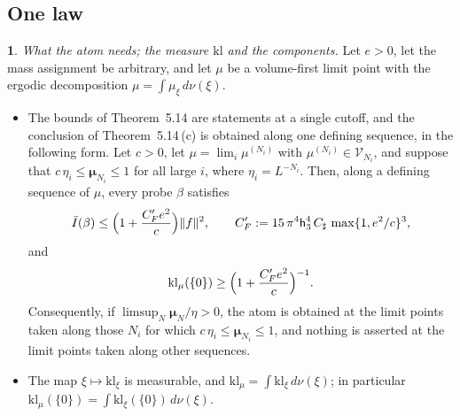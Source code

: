 \documentclass[11pt]{amsart}
\newcommand{\namedhead}{}
\theoremstyle{definition}
\newtheorem*{namedinner}{\namedhead}
\newenvironment{named}[1]{\renewcommand{\namedhead}{#1}\begin{namedinner}}{\end{namedinner}}
\begin{document}
\subsection{One law}

\begin{named}{Lemma 6.4}
\emph{What the atom needs; the measure $\mathrm{kl}$ and the components.}
Let $e>0$, let the mass assignment be arbitrary, and let $\mu$ be a volume-first limit point with the ergodic decomposition $\mu=\int\mu_\xi\,d\nu(\xi)$.
\begin{itemize}
\item[(a)] The bounds of Theorem~5.14 are statements at a single cutoff, and the conclusion of Theorem~5.14\,(c) is obtained along one defining sequence, in the following form.
Let $c>0$, let $\mu=\lim_i\mu^{(N_i)}$ with $\mu^{(N_i)}\in\mathcal V_{N_i}$, and suppose that $c\,\eta_i\le\boldsymbol\mu_{N_i}\le1$ for all large $i$, where $\eta_i=L^{-N_i}$.
Then, along a defining sequence of $\mu$, every probe $\beta$ satisfies
\begin{equation*}
\bar I(\beta)\le\Bigl(1+\frac{C_F'e^2}{c}\Bigr)\|f\|^2,\qquad C_F':=15\,\pi^4\mathsf h_3^4\,C_\sharp\,\max\{1,e^2/c\}^3,
\end{equation*}
and
\begin{equation*}
\mathrm{kl}_\mu(\{0\})\ge\Bigl(1+\frac{C_F'e^2}{c}\Bigr)^{-1}.
\end{equation*}
Consequently, if $\limsup_N\boldsymbol\mu_N/\eta>0$, the atom is obtained at the limit points taken along those $N_i$ for which $c\,\eta_i\le\boldsymbol\mu_{N_i}\le1$, and nothing is asserted at the limit points taken along other sequences.
\item[(b)] The map $\xi\mapsto\mathrm{kl}_\xi$ is measurable, and $\mathrm{kl}_\mu=\int\mathrm{kl}_\xi\,d\nu(\xi)$; in particular $\mathrm{kl}_\mu(\{0\})=\int\mathrm{kl}_\xi(\{0\})\,d\nu(\xi)$.
\end{itemize}
\end{named}
\end{document}
